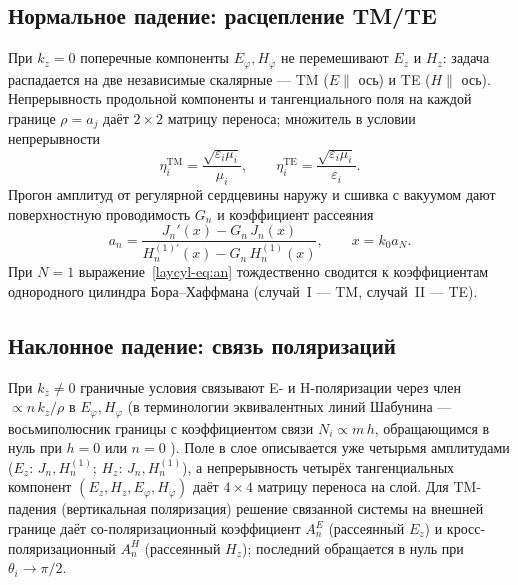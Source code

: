 \documentclass[11pt,a4paper]{article}
\begin{document}
\subsection{Нормальное падение: расцепление TM/TE}
\label{laycyl-ssec:normal}
При $k_z=0$ поперечные компоненты $E_\varphi,H_\varphi$ не перемешивают $E_z$ и $H_z$: задача распадается на две независимые скалярные --- TM ($E\parallel$ ось) и TE ($H\parallel$ ось). Непрерывность продольной компоненты и тангенциального поля на каждой границе $\rho=a_j$ даёт $2\times2$ матрицу переноса; множитель в условии непрерывности
\begin{equation}
\eta_i^{\mathrm{TM}}=\frac{\sqrt{\varepsilon_i\mu_i}}{\mu_i},\qquad
\eta_i^{\mathrm{TE}}=\frac{\sqrt{\varepsilon_i\mu_i}}{\varepsilon_i}.
\label{laycyl-eq:eta}
\end{equation}
Прогон амплитуд от регулярной сердцевины наружу и сшивка с вакуумом дают поверхностную проводимость $G_n$ и коэффициент рассеяния
\begin{equation}
a_n=\frac{J_n'(x)-G_n\,J_n(x)}{H_n^{(1)\prime}(x)-G_n\,H_n^{(1)}(x)},\qquad x=k_0 a_N.
\label{laycyl-eq:an}
\end{equation}
При $N=1$ выражение~\eqref{laycyl-eq:an} тождественно сводится к коэффициентам однородного цилиндра Бора--Хаффмана \cite{bohren1983} (случай~I --- TM, случай~II --- TE).

\subsection{Наклонное падение: связь поляризаций}
\label{laycyl-ssec:oblique}
При $k_z\neq0$ граничные условия связывают E- и H-поляризации через член $\propto n\,k_z/\rho$ в $E_\varphi,H_\varphi$ (в терминологии эквивалентных линий Шабунина --- восьмиполюсник границы с коэффициентом связи $N_i\propto m\,h$, обращающимся в нуль при $h=0$ или $n=0$ \cite{daylis2017}). Поле в слое описывается уже четырьмя амплитудами ($E_z$: $J_n,H_n^{(1)}$; $H_z$: $J_n,H_n^{(1)}$), а непрерывность четырёх тангенциальных компонент $(E_z,H_z,E_\varphi,H_\varphi)$ даёт $4\times4$ матрицу переноса на слой. Для TM-падения (вертикальная поляризация) решение связанной системы на внешней границе даёт со-поляризационный коэффициент $A_n^{E}$ (рассеянный $E_z$) и кросс-поляризационный $A_n^{H}$ (рассеянный $H_z$); последний обращается в нуль при $\theta_i\to\pi/2$.
\end{document}
